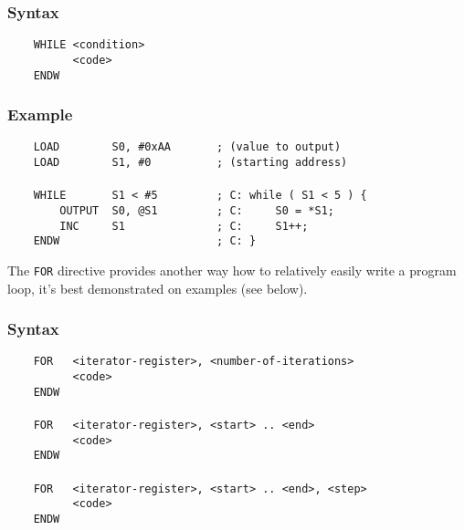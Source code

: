         \subsubsection{Syntax}
            \verb'    WHILE <condition>'\\
            \verb'          <code>'\\
            \verb'    ENDW'

        \subsubsection{Example}
            \verb'    LOAD        S0, #0xAA       ; (value to output)'\\
            \verb'    LOAD        S1, #0          ; (starting address)'\\
            \verb''\\
            \verb'    WHILE       S1 < #5         ; C: while ( S1 < 5 ) {'\\
            \verb'        OUTPUT  S0, @S1         ; C:     S0 = *S1;'\\
            \verb'        INC     S1              ; C:     S1++;'\\
            \verb'    ENDW                        ; C: }'

    \clearpage
        The \texttt{FOR} directive provides another way how to relatively easily write a program loop, it's best demonstrated on examples (see below).

        \subsubsection{Syntax}
            \verb'    FOR   <iterator-register>, <number-of-iterations>'\\
            \verb'          <code>'\\
            \verb'    ENDW'\\
            \verb''\\
            \verb'    FOR   <iterator-register>, <start> .. <end>'\\
            \verb'          <code>'\\
            \verb'    ENDW'\\
            \verb''\\
            \verb'    FOR   <iterator-register>, <start> .. <end>, <step>'\\
            \verb'          <code>'\\
            \verb'    ENDW'

